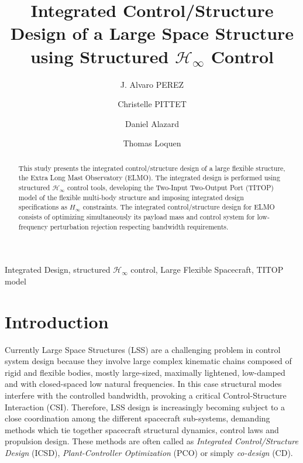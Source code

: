 \documentclass{ifacconf}
\begin{document}
\begin{frontmatter}

\title{Integrated Control/Structure Design of a Large Space Structure using Structured $\mathcal{H}_\infty$ Control} 




\author[First]{J. Alvaro PEREZ} 
\author[Second]{Christelle PITTET} 
\author[Third]{Daniel Alazard} 
\author[Fourth]{Thomas Loquen} 

\address[First]{ONERA System Control Department, 
   Toulouse, 31000 France (e-mail: Jose-Alvaro.Perez\_ Gonzalez@onera.fr)}
   \address[Second]{CNES AOCS Department, 
   Toulouse, 31000 France (e-mail: christelle.pittet@cnes.fr)}
   \address[Third]{ISAE System Control Department, 
   Toulouse, 31000 France (e-mail: daniel.alazard@isae.fr)}
      \address[Fourth]{ONERA System Control Department, 
   Toulouse, 31000 France (e-mail: thomas.loquen@onera.fr)}
\begin{abstract}                \quad This study presents the integrated control/structure design of a large flexible structure, the Extra Long Mast Observatory (ELMO). The integrated design is performed using structured $\mathcal{H_\infty}$ control tools, developing the Two-Input Two-Output Port (TITOP) model of the flexible multi-body structure and imposing integrated design specifications as $H_\infty$ constraints. The integrated control/structure design for ELMO consists of optimizing simultaneously its payload mass and control system for low-frequency perturbation rejection respecting bandwidth requirements.
\end{abstract}

\begin{keyword}
Integrated Design, structured $\mathcal{H}_\infty$ control, Large Flexible Spacecraft,  TITOP model
\end{keyword}

\end{frontmatter}


\section{Introduction}
Currently Large Space Structures (LSS) are a challenging problem in control system design because they involve large complex kinematic chains composed of rigid and flexible bodies, mostly large-sized, maximally lightened, low-damped and with closed-spaced low natural frequencies. In this case structural modes interfere with the controlled bandwidth, provoking a critical Control-Structure Interaction (CSI). Therefore, LSS design is increasingly becoming subject to a close coordination among the different spacecraft sub-systems, demanding methods which tie together spacecraft structural dynamics, control laws and propulsion design. These methods are often called as \emph{Integrated Control/Structure Design} (ICSD), \emph{Plant-Controller Optimization} (PCO) or simply \emph{co-design} (CD).
\end{document}
